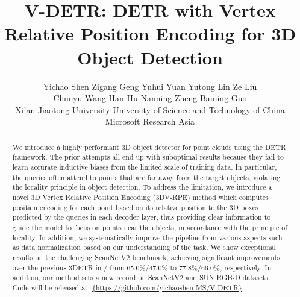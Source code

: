\documentclass[10pt,twocolumn,letterpaper]{article}
\begin{document}
\title{\bf{V-DETR: DETR with Vertex Relative Position Encoding for 3D Object Detection}}



\author{
Yichao Shen\quad\;
Zigang Geng \quad
Yuhui Yuan \quad
Yutong Lin \quad
Ze Liu \quad \\
Chunyu Wang \quad\quad\;
Han Hu \quad\quad\;
Nanning Zheng \quad\quad\;
Baining Guo \\\hspace{-5mm}
Xi'an Jiaotong University \quad
University of Science and Technology of China \quad
Microsoft Research Asia
}


\maketitle


\begin{abstract}
We introduce a highly performant 3D object detector for point clouds using the DETR framework. The prior attempts all end up with suboptimal results because they fail to learn accurate inductive biases from the limited scale of training data. In particular, the queries often attend to points that are far away from the target objects, violating the locality principle in object detection. To address the limitation, we introduce a novel 3D Vertex Relative Position Encoding (3DV-RPE) method which computes position encoding for each point based on its relative position to the 3D boxes predicted by the queries in each decoder layer, thus providing clear information to guide the model to focus on points near the objects, in accordance with the principle of locality. In addition, we systematically improve the pipeline from various aspects such as data normalization based on our understanding of the task. We show exceptional results on the challenging ScanNetV2 benchmark, achieving significant improvements over the previous 3DETR in / from 65.0\%/47.0\% to 77.8\%/66.0\%, respectively. In addition, our method sets a new record on ScanNetV2 and SUN RGB-D datasets.
Code will be released at: {\url{{https://github.com/yichaoshen-MS/V-DETR}}}.
\end{abstract}
\end{document}
